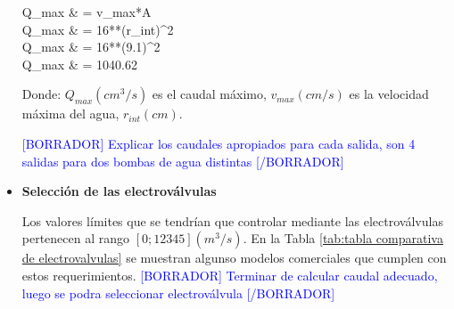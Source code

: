 \begin{itemize}
	\begin{myequation}\label{eq:calculo de caudal maximo}
		\begin{split}
			Q_{max} & = v_{max}*A \\
			Q_{max} & = 16**(r_{int})^2 \\
			Q_{max} & = 16**(9.1)^2 \\
			Q_{max} & = 1040.62 
		\end{split}		
	\end{myequation}

	Donde: $Q_{max} (cm^3/s)$ es el caudal máximo, $v_{max} (cm/s)$ es la velocidad máxima del agua, $r_{int} (cm)$.
	
	\textcolor{blue}{[BORRADOR] Explicar los caudales apropiados para cada salida, son 4 salidas para dos bombas de agua distintas [/BORRADOR]} 	
	
	\item \textbf{Selección de las electroválvulas}
	
	Los valores límites que se tendrían que controlar mediante las electroválvulas pertenecen al rango $[0;12345] (m^3/s)$. En la Tabla \ref{tab:tabla comparativa de electrovalvulas} se muestran algunso modelos comerciales que cumplen con estos requerimientos. \textcolor{blue}{[BORRADOR] Terminar de calcular caudal adecuado, luego se podra seleccionar electroválvula [/BORRADOR]}
	

\end{itemize}
